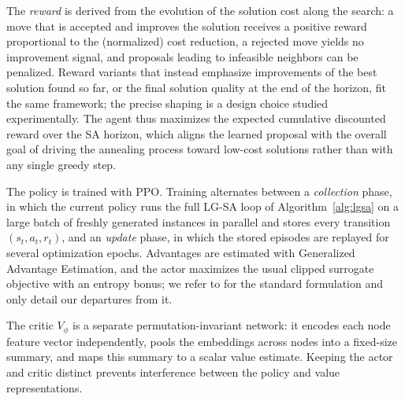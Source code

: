 \documentclass[letterpaper]{article} %
\begin{document}
The \textit{reward} is derived from the evolution of the solution cost along the search: a move that is accepted and improves the solution receives a positive reward proportional to the (normalized) cost reduction, a rejected move yields no improvement signal, and proposals leading to infeasible neighbors can be penalized. Reward variants that instead emphasize improvements of the best solution found so far, or the final solution quality at the end of the horizon, fit the same framework; the precise shaping is a design choice studied experimentally. The agent thus maximizes the expected cumulative discounted reward over the SA horizon, which aligns the learned proposal with the overall goal of driving the annealing process toward low-cost solutions rather than with any single greedy step.

The policy is trained with PPO. Training alternates between a \textit{collection} phase, in which the current policy runs the full LG-SA loop of Algorithm~\ref{alg:lgsa} on a large batch of freshly generated instances in parallel and stores every transition $(s_t, a_t, r_t)$, and an \textit{update} phase, in which the stored episodes are replayed for several optimization epochs. Advantages are estimated with Generalized Advantage Estimation, and the actor maximizes the usual clipped surrogate objective with an entropy bonus; we refer to \citet{schulman_proximal_2017} for the standard formulation and only detail our departures from it.

The critic $V_\phi$ is a separate permutation-invariant network: it encodes each node feature vector independently, pools the embeddings across nodes into a fixed-size summary, and maps this summary to a scalar value estimate. Keeping the actor and critic distinct prevents interference between the policy and value representations.
\end{document}
